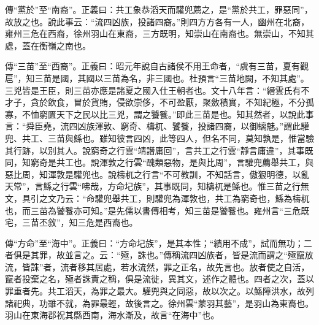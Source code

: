 {\noindent\zhuan{}\fzbyks 傳“黨於”至“南裔”。正義曰：共工象恭滔天而驩兜薦之，是“黨於共工，罪惡同”，故放之也。說此事云：“流四凶族，投諸四裔。”則四方方各有一人，幽州在北裔，雍州三危在西裔，徐州羽山在東裔，三方既明，知崇山在南裔也。無崇山，不知其處，蓋在衡嶺之南也。 \par}

{\noindent\zhuan{}\fzbyks 傳“三苗”至“西裔”。正義曰：昭元年說自古諸侯不用王命者，“虞有三苗，夏有觀扈”，知三苗是國，其國以三苗為名，非三國也。杜預言“三苗地闕，不知其處”。三兇皆是王臣，則三苗亦應是諸夏之國入仕王朝者也。文十八年言：“縉雲氏有不才子，貪於飲食，冒於貨賄，侵欲崇侈，不可盈厭，聚斂積實，不知紀極，不分孤寡，不恤窮匱天下之民以比三兇，謂之饕餮。”即此三苗是也。知其然者，以說此事言：“舜臣堯，流四凶族渾敦、窮奇、檮杌、饕餮，投諸四裔，以御螭魅。”謂此驩兜、共工、三苗與鯀也。雖知彼言四凶，此等四人，但名不同，莫知孰是，惟當驗其行跡，以別其人。說窮奇之行雲“靖譖庸回”，言共工之行雲“靜言庸違”，其事既同，知窮奇是共工也。說渾敦之行雲“醜類惡物，是與比周”，言驩兜薦舉共工，與惡比周，知渾敦是驩兜也。說檮杌之行言“不可教訓，不知話言，傲狠明德，以亂天常”，言鯀之行雲“咈哉，方命圮族”，其事既同，知檮杌是鯀也。惟三苗之行無文，具引之文乃云：“命驩兜舉共工，則驩兜為渾敦也，共工為窮奇也，鯀為檮杌也，而三苗為饕餮亦可知。”是先儒以書傳相考，知三苗是饕餮也。雍州言“三危既宅，三苗丕敘”，知三危是西裔也。 \par}

{\noindent\zhuan{}\fzbyks 傳“方命”至“海中”。正義曰：“方命圮族”，是其本性；“績用不成”，試而無功；二者俱是其罪，故並言之。云：“殛，誅也。”傳稱流四凶族者，皆是流而謂之“殛竄放流，皆誅”者，流者移其居處，若水流然，罪之正名，故先言也。放者使之自活，竄者投棄之名，殛者誅責之稱，俱是流徙，異其文，述作之體也。四者之次，蓋以罪重者先。共工滔天，為罪之最大。驩兜與之同惡，故以次之。以鯀障洪水，故列諸祀典，功雖不就，為罪最輕，故後言之。徐州雲“蒙羽其藝”，是羽山為東裔也。羽山在東海郡祝其縣西南，海水漸及，故言“在海中”也。 \par}


